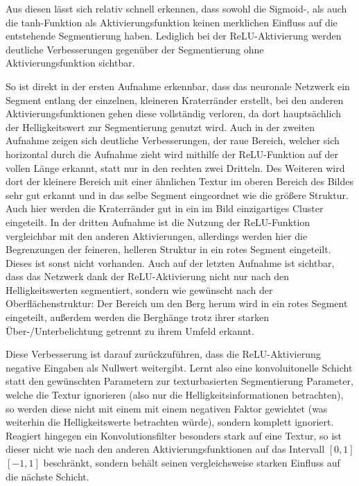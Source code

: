 Aus diesen lässt sich relativ schnell erkennen, dass sowohl die Sigmoid-, als auch die tanh-Funktion als Aktivierungsfunktion keinen merklichen Einfluss auf die entstehende Segmentierung haben. Lediglich bei der ReLU-Aktivierung werden deutliche Verbesserungen gegenüber der Segmentierung ohne Aktivierungsfunktion sichtbar.

So ist direkt in der ersten Aufnahme erkennbar, dass das neuronale Netzwerk ein Segment entlang der einzelnen, kleineren Kraterränder erstellt, bei den anderen Aktivierungsfunktionen gehen diese vollständig verloren, da dort hauptsächlich der Helligkeitswert zur Segmentierung genutzt wird. Auch in der zweiten Aufnahme zeigen sich deutliche Verbesserungen, der raue Bereich, welcher sich horizontal durch die Aufnahme zieht wird mithilfe der ReLU-Funktion auf der vollen Länge erkannt, statt nur in den rechten zwei Dritteln. Des Weiteren wird dort der kleinere Bereich mit einer ähnlichen Textur im oberen Bereich des Bildes sehr gut erkannt und in das selbe Segment eingeordnet wie die größere Struktur. Auch hier werden die Kraterränder gut in ein im Bild einzigartiges Cluster eingeteilt. In der dritten Aufnahme ist die Nutzung der ReLU-Funktion vergleichbar mit den anderen Aktivierungen, allerdings werden hier die Begrenzungen der feineren, helleren Struktur in ein rotes Segment eingeteilt. Dieses ist sonst nicht vorhanden. Auch auf der letzten Aufnahme ist sichtbar, dass das Netzwerk dank der ReLU-Aktivierung nicht nur nach den Helligkeitswerten segmentiert, sondern wie gewünscht nach der Oberflächenstruktur: Der Bereich um den Berg herum wird in ein rotes Segment eingeteilt, außerdem werden die Berghänge trotz ihrer starken Über-/Unterbelichtung getrennt zu ihrem Umfeld erkannt.

Diese Verbesserung ist darauf zurückzuführen, dass die ReLU-Aktivierung negative Eingaben als Nullwert weitergibt. Lernt also \bspw eine konvoluitonelle Schicht statt den gewünschten Parametern zur texturbasierten Segmentierung Parameter, welche die Textur ignorieren (also nur die Helligkeitsinformationen betrachten), so werden diese nicht mit einem mit einem negativen Faktor gewichtet (was weiterhin die Helligkeitswerte betrachten würde), sondern komplett ignoriert. Reagiert hingegen ein Konvolutionsfilter besonders stark auf eine Textur, so ist dieser nicht wie nach den anderen Aktivierungsfunktionen auf das Intervall $\left[0, 1\right]$ \bzw $\left[-1, 1\right]$ beschränkt, sondern behält seinen vergleichsweise starken Einfluss auf die nächste Schicht.

